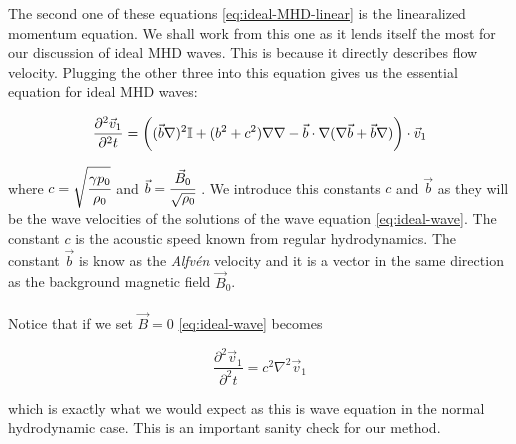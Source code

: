 {\centering 
\noindent {}
\par}

The second one of these equations \autoref{eq:ideal-MHD-linear} is the linearalized momentum equation. We shall work from this one as it lends itself the most for our discussion of ideal MHD waves. This is because it directly describes flow velocity. Plugging the other three into this equation gives us the essential equation for ideal MHD waves:

\begin{equation}
	\label{eq:ideal-wave}		
		\frac{\partial^2 \vec{v}_1}{\partial^2 t} = \bigg( (\vec{b} \nabla)^2 \mathbb{I} + (b^2 + c^2)\nabla \nabla - \vec{b} \cdot \nabla (\nabla \vec{b} + \vec{b} \nabla) \bigg) \cdot \vec{v}_1
\end{equation}

where $c = \sqrt{\cfrac{\gamma p_0}{\rho_0}}$ and $\vec{b} = \cfrac{\vec{B}_0}{\sqrt{\rho_0}}$ . We introduce this constants $c$ and $\vec{b}$ as they will be the wave velocities of the solutions of the wave equation \autoref{eq:ideal-wave}. The constant $c$ is the acoustic speed known from regular hydrodynamics. The constant $\vec{b}$ is know as the \textit{Alfvén } velocity and it is a vector in the same direction as the background magnetic field $\vec{B}_0$.\\
\\
Notice that if we set $\vec{B} = 0$ \autoref{eq:ideal-wave} becomes

$$ \frac{\partial^2 \vec{v}_1}{\partial^2 t} = c^2 \nabla^2 \vec{v}_1 $$

which is exactly what we would expect as this is wave equation in the normal hydrodynamic case. This is an important sanity check for our method.\\
\\


